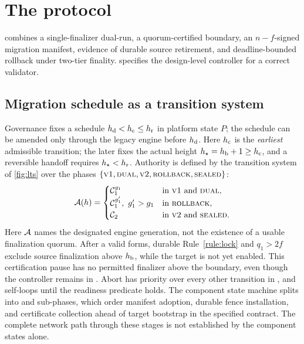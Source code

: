 \section{The \sage{} protocol}
\label{sec:protocol}

\sage{} combines a single-finalizer dual-run, a quorum-certified boundary, an $n-f$-signed
migration manifest, evidence of durable source retirement, and deadline-bounded rollback under
two-tier finality.  specifies the design-level controller for a correct validator.

\subsection{Migration schedule as a transition system}
Governance fixes a schedule $h_{\mathrm d}<h_{\mathrm c}\le h_{\mathrm r}$ in platform state $P$; the schedule can be amended only
through the legacy engine before $h_{\mathrm d}$. Here $h_{\mathrm c}$ is the \emph{earliest} admissible transition; the
\CutCert{} later fixes the actual height $h_{\star}=h_{\mathrm b}+1\ge h_{\mathrm c}$, and a reversible handoff requires
$h_{\star}<h_{\mathrm r}$. Authority is defined by the transition system of \cref{fig:lts} over the phases
$\{\textsc{v1},\textsc{dual},\textsc{v2},\textsc{rollback},\textsc{sealed}\}$:
\begin{equation}
  \mathcal{A}(h)=
  \begin{cases}
    \mathcal{C}_1^{g_1} & \text{in }\textsc{v1}\text{ and }\textsc{dual},\\
    \mathcal{C}_1^{g_1'},\ g_1'>g_1 & \text{in }\textsc{rollback},\\
    \mathcal{C}_2 & \text{in }\textsc{v2}\text{ and }\textsc{sealed}.
  \end{cases}
  \label{eq:authority}
\end{equation}
Here $\mathcal{A}$ names the designated engine generation, not the existence of a usable finalization
quorum. After a valid \CutCert{} forms, durable Rule~\ref{rule:lock} and $q_1>2f$ exclude source
finalization above $h_{\mathrm b}$, while the target is not yet enabled. This certification pause has no
permitted finalizer above the boundary, even though the controller remains in .
Abort has priority over every other transition in , and  self-loops until the
readiness predicate holds. The component state machine splits  into  and
 sub-phases, which order manifest adoption, durable fence installation, and
certificate collection ahead of target bootstrap in the specified contract. The complete network
path through these stages is not established by the component states alone.

